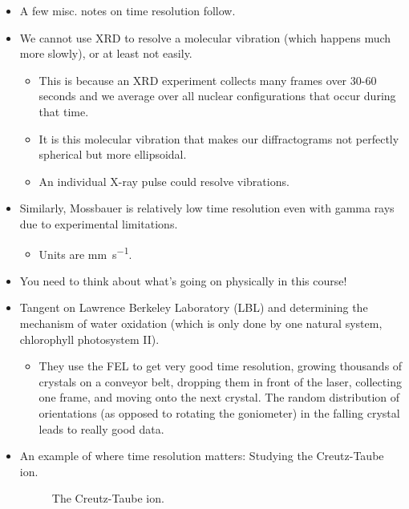 \documentclass[../notes.tex]{subfiles}
\begin{document}
\begin{itemize}
\begin{itemize}
        \item For kinetics, about the fastest we can do is stop flow at \SIrange{e-3}{e-5}{\second}.
    \end{itemize}
    \item A few misc. notes on time resolution follow.
    \item We cannot use XRD to resolve a molecular vibration (which happens much more slowly), or at least not easily.
    \begin{itemize}
        \item This is because an XRD experiment collects many frames over 30-60 seconds and we average over all nuclear configurations that occur during that time.
        \item It is this molecular vibration that makes our diffractograms not perfectly spherical but more ellipsoidal.
        \item An individual X-ray pulse could resolve vibrations.
    \end{itemize}
    \item Similarly, Mossbauer is relatively low time resolution even with gamma rays due to experimental limitations.
    \begin{itemize}
        \item Units are \si{\milli\meter\per\second}.
    \end{itemize}
    \item You need to think about what's going on physically in this course!
    \item Tangent on Lawrence Berkeley Laboratory (LBL) and determining the mechanism of water oxidation (which is only done by one natural system, chlorophyll photosystem II).
    \begin{itemize}
        \item They use the FEL to get very good time resolution, growing thousands of crystals on a conveyor belt, dropping them in front of the laser, collecting one frame, and moving onto the next crystal. The random distribution of orientations (as opposed to rotating the goniometer) in the falling crystal leads to really good data.
    \end{itemize}
    \item An example of where time resolution matters: Studying the Creutz-Taube ion.
    \begin{figure}[H]
        \centering
        \footnotesize
        \chemleft{[}
        \chemright{]^{5+}}
        \caption{The Creutz-Taube ion.}

\end{figure}
\end{itemize}
\end{document}
